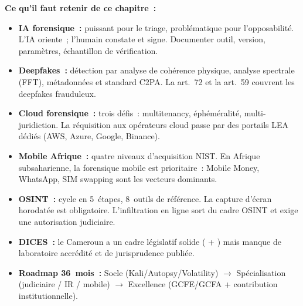 \separateur

\begin{boxresume}
\textbf{Ce qu'il faut retenir de ce chapitre~:}
\begin{itemize}
    \item \textbf{IA forensique~:} puissant pour le triage, problématique
          pour l'opposabilité. L'IA oriente~; l'humain constate et signe.
          Documenter outil, version, paramètres, échantillon de vérification.

    \item \textbf{Deepfakes~:} détection par analyse de cohérence physique,
          analyse spectrale (FFT), métadonnées et standard C2PA. La
           art.~72 et la  art.~59
          couvrent les deepfakes frauduleux.

    \item \textbf{Cloud forensique~:} trois défis~: multitenancy, éphéméralité,
          multi-juridiction. La réquisition aux opérateurs cloud passe par
          des portails LEA dédiés (AWS, Azure, Google, Binance).

    \item \textbf{Mobile Afrique~:} quatre niveaux d'acquisition NIST. En
          Afrique subsaharienne, la forensique mobile est prioritaire~:
          Mobile Money, WhatsApp, SIM swapping sont les vecteurs dominants.

    \item \textbf{OSINT~:} cycle en 5~étapes, 8~outils de référence.
          La capture d'écran horodatée est obligatoire. L'infiltration en
          ligne sort du cadre OSINT et exige une autorisation judiciaire.

    \item \textbf{DICES~:} le Cameroun a un cadre législatif solide
          ( + ) mais manque de laboratoire
          accrédité et de jurisprudence publiée.

    \item \textbf{Roadmap 36~mois~:} Socle (Kali/Autopsy/Volatility)
          $\to$ Spécialisation (judiciaire / IR / mobile)
          $\to$ Excellence (GCFE/GCFA + contribution institutionnelle).
\end{itemize}
\end{boxresume}

\bigskip

